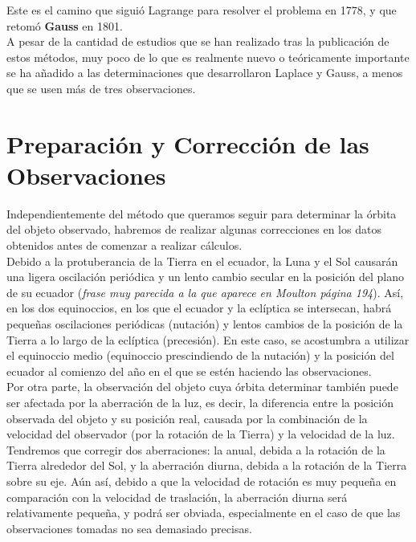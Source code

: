 \documentclass[11pt]{article}
\begin{document}
Este es el camino que siguió Lagrange para resolver el problema en 1778, y que retomó \textbf{Gauss} en 1801.\\

A pesar de la cantidad de estudios que se han realizado tras la publicación de estos métodos, muy poco de lo que es realmente nuevo o teóricamente importante se ha añadido a las determinaciones que desarrollaron Laplace y Gauss, a menos que se usen más de tres observaciones.\\


\section{Preparación y Corrección de las Observaciones}
Independientemente del método que queramos seguir para determinar la órbita del objeto observado, habremos de realizar algunas correcciones en los datos obtenidos antes de comenzar a realizar cálculos.\\

Debido a la protuberancia de la Tierra en el ecuador, la Luna y el Sol causarán una ligera oscilación periódica y un lento cambio secular en la posición del plano de su ecuador (\textit{frase muy parecida a la que aparece en Moulton página 194}). Así, en los dos equinoccios, en los que el ecuador y la eclíptica se intersecan, habrá pequeñas oscilaciones periódicas (nutación) y lentos cambios de la posición de la Tierra a lo largo de la eclíptica (precesión). En este caso, se acostumbra a utilizar el equinoccio medio (equinoccio prescindiendo de la nutación) y la posición del ecuador al comienzo del año en el que se estén haciendo las observaciones.\\

Por otra parte, la observación del objeto cuya órbita determinar también puede ser afectada por la aberración de la luz, es decir, la diferencia entre la posición observada del objeto y su posición real, causada por la combinación de la velocidad del observador (por la rotación de la Tierra) y la velocidad de la luz. Tendremos que corregir dos aberraciones: la anual, debida a la rotación de la Tierra alrededor del Sol, y la aberración diurna, debida a la rotación de la Tierra sobre su eje. Aún así, debido a que la velocidad de rotación es muy pequeña en comparación con la velocidad de traslación, la aberración diurna será relativamente pequeña, y podrá ser obviada, especialmente en el caso de que las observaciones tomadas no sea demasiado precisas.\\
\end{document}
